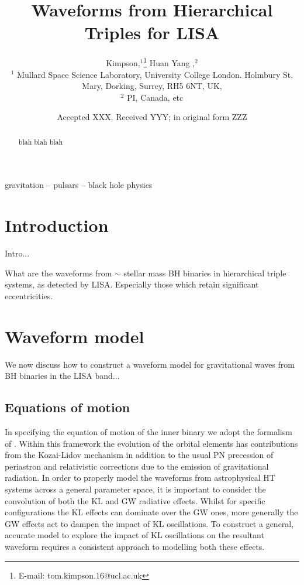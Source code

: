 \documentclass[a4paper,fleqn,usenatbib]{mnras}
\title[Hierarchical Triples]{Waveforms from Hierarchical Triples for LISA}
\author[T. Kimpson et al.]{
 Kimpson,$^{1}$\thanks{E-mail: tom.kimpson.16@ucl.ac.uk}
Huan Yang  ,$^{2}$
\\
$^{1}$ Mullard Space Science Laboratory, University College London. Holmbury St. Mary, Dorking, Surrey, RH5 6NT, UK, \\
$^{2}$ PI, Canada, etc
}
\date{Accepted XXX. Received YYY; in original form ZZZ}
\begin{document}
\label{firstpage}
\pagerange{\pageref{firstpage}--\pageref{lastpage}}
\maketitle

\begin{abstract}
blah blah blah
\end{abstract}

\begin{keywords}
gravitation -- pulsars -- black hole physics
\end{keywords}



\section{Introduction}
Intro...

\noindent What are the waveforms from $\sim$ stellar mass BH binaries in hierarchical triple systems, as detected by LISA. Especially those which retain significant eccentricities.

\section{Waveform model}
We now discuss how to construct a waveform model for gravitational waves from BH binaries in the LISA band...



\subsection{Equations of motion}

In specifying the equation of motion of the inner binary we adopt the formalism of \citep{Randall2018}. Within this framework the evolution of the orbital elements has contributions from the Kozai-Lidov mechanism in addition to the usual PN precession of periastron and relativistic corrections due to the emission of gravitational radiation. In order to properly model the waveforms from astrophysical HT systems across a general parameter space, it is important to consider the convolution of both the KL and GW radiative effects. Whilst for specific configurations the KL effects can dominate over the GW ones, more generally the GW effects act to dampen the impact of KL oscillations. To construct a general, accurate model to explore the impact of KL oscillations on the resultant waveform requires a consistent approach to modelling both these effects. \newline 
\end{document}
